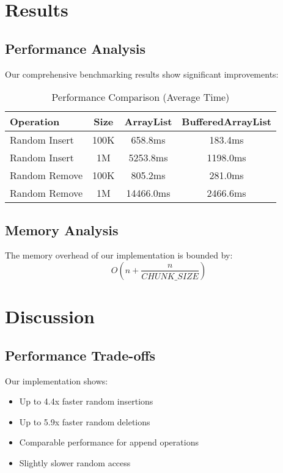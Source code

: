 \documentclass[twocolumn]{article}
\begin{document}
\section{Results}
\subsection{Performance Analysis}
Our comprehensive benchmarking results show significant improvements:

\begin{table}[h]
\centering
\begin{tabular}{|l|c|c|c|}
\hline
\textbf{Operation} & \textbf{Size} & \textbf{ArrayList} & \textbf{BufferedArrayList} \\
\hline
Random Insert & 100K & 658.8ms & 183.4ms \\
Random Insert & 1M & 5253.8ms & 1198.0ms \\
Random Remove & 100K & 805.2ms & 281.0ms \\
Random Remove & 1M & 14466.0ms & 2466.6ms \\
\hline
\end{tabular}
\caption{Performance Comparison (Average Time)}
\end{table}

\subsection{Memory Analysis}
The memory overhead of our implementation is bounded by:
\begin{equation}
O(n + \frac{n}{CHUNK\_SIZE})
\end{equation}

\section{Discussion}
\subsection{Performance Trade-offs}
Our implementation shows:
\begin{itemize}
    \item Up to 4.4x faster random insertions
    \item Up to 5.9x faster random deletions
    \item Comparable performance for append operations
    \item Slightly slower random access
\end{itemize}
\end{document}

